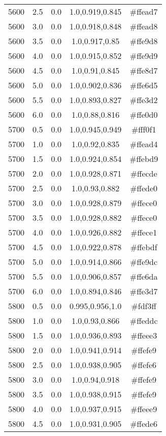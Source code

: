 \begin{tabular}{ccccc}
5600 & 2.5 & 0.0 & 1.0,0.919,0.845 & \#ffead7 \\ 
5600 & 3.0 & 0.0 & 1.0,0.918,0.848 & \#ffead8 \\ 
5600 & 3.5 & 0.0 & 1.0,0.917,0.85 & \#ffe9d8 \\ 
5600 & 4.0 & 0.0 & 1.0,0.915,0.852 & \#ffe9d9 \\ 
5600 & 4.5 & 0.0 & 1.0,0.91,0.845 & \#ffe8d7 \\ 
5600 & 5.0 & 0.0 & 1.0,0.902,0.836 & \#ffe6d5 \\ 
5600 & 5.5 & 0.0 & 1.0,0.893,0.827 & \#ffe3d2 \\ 
5600 & 6.0 & 0.0 & 1.0,0.88,0.816 & \#ffe0d0 \\ 
5700 & 0.5 & 0.0 & 1.0,0.945,0.949 & \#fff0f1 \\ 
5700 & 1.0 & 0.0 & 1.0,0.92,0.835 & \#ffead4 \\ 
5700 & 1.5 & 0.0 & 1.0,0.924,0.854 & \#ffebd9 \\ 
5700 & 2.0 & 0.0 & 1.0,0.928,0.871 & \#ffecde \\ 
5700 & 2.5 & 0.0 & 1.0,0.93,0.882 & \#ffede0 \\ 
5700 & 3.0 & 0.0 & 1.0,0.928,0.879 & \#ffece0 \\ 
5700 & 3.5 & 0.0 & 1.0,0.928,0.882 & \#ffece0 \\ 
5700 & 4.0 & 0.0 & 1.0,0.926,0.882 & \#ffece1 \\ 
5700 & 4.5 & 0.0 & 1.0,0.922,0.878 & \#ffebdf \\ 
5700 & 5.0 & 0.0 & 1.0,0.914,0.866 & \#ffe9dc \\ 
5700 & 5.5 & 0.0 & 1.0,0.906,0.857 & \#ffe6da \\ 
5700 & 6.0 & 0.0 & 1.0,0.894,0.846 & \#ffe3d7 \\ 
5800 & 0.5 & 0.0 & 0.995,0.956,1.0 & \#fdf3ff \\ 
5800 & 1.0 & 0.0 & 1.0,0.93,0.866 & \#ffeddc \\ 
5800 & 1.5 & 0.0 & 1.0,0.936,0.893 & \#ffeee3 \\ 
5800 & 2.0 & 0.0 & 1.0,0.941,0.914 & \#ffefe9 \\ 
5800 & 2.5 & 0.0 & 1.0,0.938,0.905 & \#ffefe6 \\ 
5800 & 3.0 & 0.0 & 1.0,0.94,0.918 & \#ffefe9 \\ 
5800 & 3.5 & 0.0 & 1.0,0.938,0.915 & \#ffefe9 \\ 
5800 & 4.0 & 0.0 & 1.0,0.937,0.915 & \#ffeee9 \\ 
5800 & 4.5 & 0.0 & 1.0,0.931,0.905 & \#ffede6 \\ 

\end{tabular}
